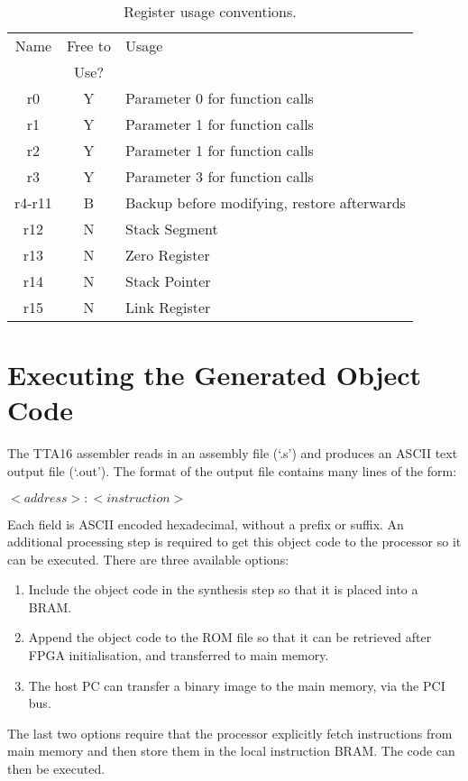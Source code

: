 \begin{table}[h!]
\begin{center}
\begin{tabular}{c | c l}
Name& Free to	& Usage \\
	& \multicolumn{1}{c}{Use?}	&		\\
\hline
r0	& Y	& Parameter 0 for function calls \\
r1	& Y	& Parameter 1 for function calls \\
r2	& Y	& Parameter 1 for function calls \\
r3	& Y	& Parameter 3 for function calls \\
r4-r11	& B	& Backup before modifying, restore afterwards \\
r12	& N	& Stack Segment \\
r13	& N	& Zero Register \\
r14 & N & Stack Pointer \\
r15	& N	& Link Register	\\
\end{tabular}
\caption[Register usage conventions]{Register usage conventions.}
\label{TTAPROG_Register_Conventions}
\end{center}
\end{table}


\section{Executing the Generated Object Code}

The TTA16 assembler reads in an assembly file (`.s') and produces an ASCII text
output file (`.out'). The format of the output file contains many lines of
the form:
\begin{center}
$<address>:<instruction>$
\end{center}
Each field is ASCII encoded hexadecimal, without a prefix or suffix. An
additional processing step is required to get this object code to the processor
so it can be executed. There are three available options:
\begin{enumerate}
  \item Include the object code in the synthesis step so that it is placed into
  a BRAM.
  \item Append the object code to the ROM file so that it can be retrieved after
  FPGA initialisation, and transferred to main memory.
  \item The host PC can transfer a binary image to the main memory, via the PCI
  bus.
\end{enumerate}
The last two options require that the processor explicitly fetch instructions
from main memory and then store them in the local instruction BRAM. The code
can then be executed.

